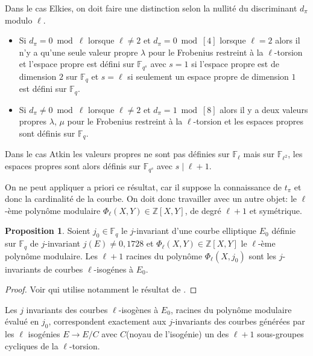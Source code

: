 \documentclass[10pt,a4paper]{book}
\theoremstyle{plain}
\theoremstyle{definition}
\theoremstyle{definition}
\theoremstyle{definition}
\theoremstyle{definition}
\newtheorem{prop}[thm]{Proposition}
\theoremstyle{definition}
\theoremstyle{remark}
\theoremstyle{remark}
\theoremstyle{definition}
\begin{document}
	Dans le cas Elkies, on doit faire une distinction selon la nullité du discriminant $d_{\pi}$ modulo $\ell$. 
\begin{itemize}	
	\item Si $d_{\pi}=0 \bmod \ell$ lorsque $\ell \neq 2$ et $d_{\pi}=0 \bmod [4]$ lorsque $\ell=2$  alors il n'y a qu'une seule valeur propre $\lambda$ pour le Frobenius restreint à la $\ell$-torsion  et l'espace propre est défini sur $\mathbb{F}_{q^s}$ avec $s=1$ si l'espace propre est de dimension $2$ sur $\mathbb{F}_q$ et $s=\ell$ si seulement un espace propre de dimension $1$ est défini sur $\mathbb{F}_q$.
	\item Si $d_{\pi} \neq 0 \bmod \ell$ lorsque $\ell \neq 2$ et $d_{\pi}=1 \bmod [8]$ alors il y a deux valeurs propres $\lambda$, $\mu$ pour le Frobenius restreint à la $\ell$-torsion  et les espaces propres sont définis sur $\mathbb{F}_q$.
\end{itemize}

	Dans le cas Atkin les valeurs propres ne sont pas définies sur $\mathbb{F}_\ell$ mais sur $\mathbb{F}_{\ell^2}$, les espaces propres sont alors définis sur $\mathbb{F}_{q^s}$ avec $s \mid \ell+1$.
	
	
	On ne peut appliquer a priori ce résultat, car il suppose la connaissance de 
$t_{\pi}$ et donc la cardinalité de la courbe. On doit donc travailler avec un 
autre objet: le $\ell$-ème polynôme modulaire $\Phi_{\ell}(X,Y) \in 
\mathbb{Z}[X,Y] $, de degré $\ell+1$ et symétrique. 
 
\begin{prop}
Soient $j_0 \in \mathbb{F}_q$ le $j$-invariant d'une courbe elliptique $E_0$ définie sur $\mathbb{F}_q$ de $j$-invariant $j(E) \neq 0,1728$ et  $\Phi_{\ell}(X,Y) \in \mathbb{Z}[X,Y] $ le $\ell$-ème polynôme modulaire. Les $\ell+1$ racines du polynôme $\Phi_{\ell}(X,j_0)$ sont les $j$-invariants de courbes $\ell$-isogénes à $E_0$. 
\end{prop}

\begin{proof}
Voir \cite[Théorème 4.1.1]{Fouquet01} qui utilise notamment le résultat de 
\cite[Theorem 11.23]{Cox89}.
\end{proof}
 
Les $j$ invariants des courbes $\ell$-isogènes à $E_0$, racines du polynôme modulaire évalué en $j_0$, correspondent exactement aux $j$-invariants des  courbes générées par les $\ell$ isogénies $E \to E/C$ avec $C$(noyau de l'isogénie) un des $\ell+1$ sous-groupes cycliques de la $\ell$-torsion. 
\end{document}
